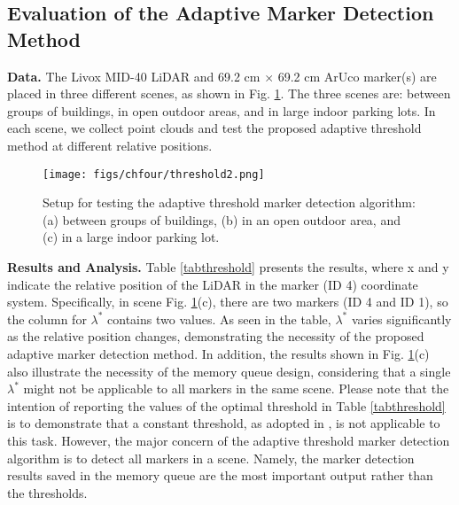 \subsection{Evaluation of the Adaptive Marker Detection Method} \label{test0}
\noindent\textbf{Data.}
The Livox MID-40 LiDAR and 69.2 cm $\times$ 69.2 cm ArUco marker(s) are placed in three different scenes, as shown in Fig. \ref{threshold2}. The three scenes are: between groups of buildings, in open outdoor areas, and in large indoor parking lots. In each scene, we collect point clouds and test the proposed adaptive threshold method at different relative positions.
\begin{figure}[ht] 
	\centering
\texttt{[image: figs/chfour/threshold2.png]}
	\caption{Setup for testing the adaptive threshold marker detection algorithm: (a) between groups of buildings, (b) in an open outdoor area, and (c) in a large indoor parking lot.}
	\label{threshold2}
\end{figure} \par
\noindent\textbf{Results and Analysis.}
Table \ref{tabthreshold} presents the results, where x and y indicate the relative position of the LiDAR in the marker (ID 4) coordinate system. Specifically, in scene Fig. \ref{threshold2}(c), there are two markers (ID 4 and ID 1), so the column for $\lambda^{*}$ contains two values. As seen in the table, $\lambda^{*}$ varies significantly as the relative position changes, demonstrating the necessity of the proposed adaptive marker detection method. In addition, the results shown in Fig. \ref{threshold2}(c) also illustrate the necessity of the memory queue design, considering that a single $\lambda^{*}$ might not be applicable to all markers in the same scene. Please note that the intention of reporting the values of the optimal threshold in Table \ref{tabthreshold} is to demonstrate that a constant threshold, as adopted in \cite{iilfm}, is not applicable to this task. However, the major concern of the adaptive threshold marker detection algorithm is to detect all markers in a scene. Namely, the marker detection results saved in the memory queue are the most important output rather than the thresholds.

